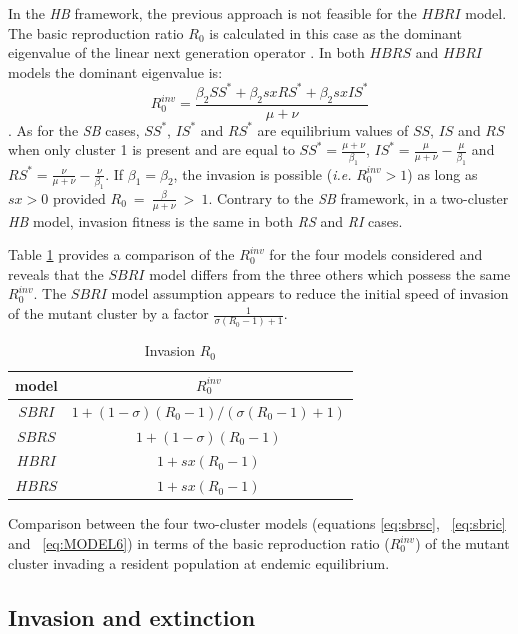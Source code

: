 In the \textit{HB} framework, the previous approach is not feasible
for the $HBRI$ model. The basic reproduction ratio $R_0$ is 
calculated in this case as the dominant eigenvalue of the linear next generation
operator \citep{Diekmann2000}.  In both $HBRS$ and $HBRI$ models the
dominant eigenvalue is:
$$R_0^{inv} = \frac{\beta_2 SS^* + \beta_2 s x RS^* +\beta_2 s x IS^*}{\mu+\nu}$$.
As for the \textit{SB} cases, $SS^*$, $IS^*$ and $RS^*$ are
equilibrium values of $SS$, $IS$ and $RS$ when only cluster 1 is
present and are equal to $SS^* = \frac{\mu + \nu}{\beta_1}$, $IS^* =
\frac{\mu}{\mu + \nu} - \frac{\mu}{\beta_1}$ and $RS^* =
\frac{\nu}{\mu + \nu} - \frac{\nu}{\beta_1}$. If $\beta_1 = \beta_2$,
the invasion is possible (\textit{i.e.} $R_0^{inv} >1$) as long as $s
x > 0$ provided $R_0~=~\frac{\beta}{\mu + \nu}~>~1$. Contrary to the
\textit{SB} framework, in a two-cluster \textit{HB} model, invasion
fitness is the same in both \textit{RS} and \textit{RI} cases.

Table \ref{tab:R0} provides a comparison of the $R_0^{inv}$ for the
four models considered and reveals that the $SBRI$ model differs from
the three others which possess the same $R_0^{inv}$.  The $SBRI$ model
assumption appears to reduce the initial speed of invasion of the
mutant cluster by a factor $\frac{1}{\sigma (R_0 -1) +1}$.


\begin{table}[!ht]
  \caption{Invasion $R_0$}
  \begin{tabular}{|c|c|}
    \hline
    model & $R_0^{inv}$ \\
    \hline
    $SBRI$ & $1 + (1-\sigma)(R_0 -1)/(\sigma (R_0-1) +1)$ \\
    \hline
    $SBRS$ & $1 + (1-\sigma)(R_0 -1)$\\
    \hline
    $HBRI$ & $1 + sx (R_0 -1)$\\
    \hline
    $HBRS$ & $1 + sx (R_0 -1)$\\
    \hline
  \end{tabular}
  \begin{flushleft} Comparison between the four two-cluster models (equations
    \eqref{eq:sbrsc}, ~\eqref{eq:sbric} and ~\eqref{eq:MODEL6}) in terms
    of the basic reproduction ratio ($R_0^{inv}$) of the mutant cluster
    invading a resident population at endemic equilibrium.
  \end{flushleft}
  \label{tab:R0}
\end{table}



\subsection{Invasion and extinction}

